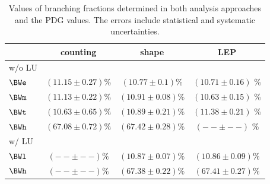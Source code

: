 \begin{table}[htb!]
    \centering
    \setlength{\tabcolsep}{1.5em}
    \renewcommand{\arraystretch}{1.5}
    \caption{Values of branching fractions determined in both
        analysis approaches and the PDG values.  The errors include
        statistical and systematic uncertainties.
    \label{tab:results}}
    \begin{tabular}{l|ccc}
                           & counting              & shape                 & LEP \\
    \hline                                                                 
    w/o LU &&& \\
    \hline
    $\BWe$      & $(11.15 \pm 0.27) \%$ & $(10.77 \pm 0.1) \%$  & $(10.71 \pm 0.16)$ \% \\
    $\BWm$      & $(11.13 \pm 0.22) \%$ & $(10.91 \pm 0.08) \%$ & $(10.63 \pm 0.15)$ \% \\
    $\BWt$      & $(10.63 \pm 0.65) \%$ & $(10.89 \pm 0.21) \%$ & $(11.38 \pm 0.21)$ \% \\
    $\BWh$      & $(67.08 \pm 0.72) \%$ & $(67.42 \pm 0.28) \%$ & $(-- \pm --)$ \% \\
    \hline
    w/ LU &&& \\
    \hline
    $\BWl$      & $(-- \pm --)\%$       & $(10.87 \pm 0.07)\%$  & $(10.86 \pm 0.09)\%$  \\
    $\BWh$      & $(-- \pm --)\%$       & $(67.38 \pm 0.22)\%$  & $(67.41 \pm 0.27)\%$  \\
    \end{tabular}
\end{table}


\begin{table}[htb!]
    \centering
    \renewcommand{\arraystretch}{1.5}
    \caption{Correlation matrix of leptonic branching fractions.}
    \label{tab:results_corr}
\end{table}





